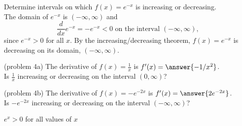 \documentclass{ximera}
\begin{document}
\begin{example}[example 4]
Determine intervals on which $f(x) = e^{-x}$ is increasing or decreasing.\\
The domain of $e^{-x}$ is $(-\infty,\infty)$ and 
\[
\frac{d}{dx} e^{-x} = -e^{-x} < 0 \text{ on the interval } (-\infty, \infty),
\]
since $e^{-x} > 0$ for all $x$. By the increasing/decreasing theorem, $f(x) = e^{-x}$ is decreasing on its domain, $(-\infty, \infty)$.

\begin{image}
\end{image}

\end{example}



\begin{problem}(problem 4a)
The derivative of $f(x)=\frac{1}{x}$ is $f'(x) = \answer{-1/x^2}$.\\
Is $\frac{1}{x}$ increasing or decreasing on the interval $(0, \infty)$?
\begin{multipleChoice}
\end{multipleChoice}
\end{problem}



\begin{problem}(problem 4b)
The derivative of $f(x) = -e^{-2x}$ is $f'(x) = \answer{2e^{-2x}}$.\\
Is $-e^{-2x}$ increasing or decreasing on the interval $(-\infty, \infty)$?
\begin{hint}
$e^x > 0$ for all values of $x$
\end{hint}
\begin{multipleChoice}
\end{multipleChoice}
\end{problem}
\end{document}

